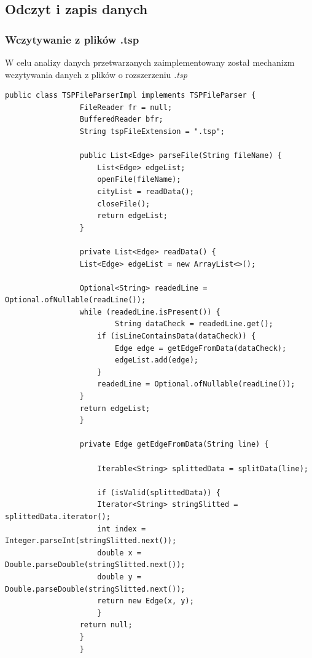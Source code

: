 \documentclass{article}
\begin{document}
	\subsection{Odczyt i zapis danych}
		\subsubsection{Wczytywanie z plików .tsp}
			W celu analizy danych przetwarzanych zaimplementowany został mechanizm wczytywania danych z plików o rozszerzeniu {\it .tsp}
			
				\begin{lstlisting}[xleftmargin=-150pt]
				public class TSPFileParserImpl implements TSPFileParser {
				 FileReader fr = null;
				 BufferedReader bfr;
				 String tspFileExtension = ".tsp";
				 
				 public List<Edge> parseFile(String fileName) {
					 List<Edge> edgeList;
					 openFile(fileName);
					 cityList = readData();
					 closeFile();
					 return edgeList;
				 }
				 
				 private List<Edge> readData() {
				 List<Edge> edgeList = new ArrayList<>();
				 
				 Optional<String> readedLine = Optional.ofNullable(readLine());
				 while (readedLine.isPresent()) {
						 String dataCheck = readedLine.get();
					 if (isLineContainsData(dataCheck)) {
						 Edge edge = getEdgeFromData(dataCheck);
						 edgeList.add(edge);
					 }
					 readedLine = Optional.ofNullable(readLine());
				 }
				 return edgeList;
				 }
				 					 
				 private Edge getEdgeFromData(String line) {
				 
					 Iterable<String> splittedData = splitData(line);
					 
					 if (isValid(splittedData)) {
					 Iterator<String> stringSlitted = splittedData.iterator();
					 int index = Integer.parseInt(stringSlitted.next());
					 double x = Double.parseDouble(stringSlitted.next());
					 double y = Double.parseDouble(stringSlitted.next());
					 return new Edge(x, y);
					 }
				 return null;
				 }
				 }
				\end{lstlisting}
		
\end{document}
